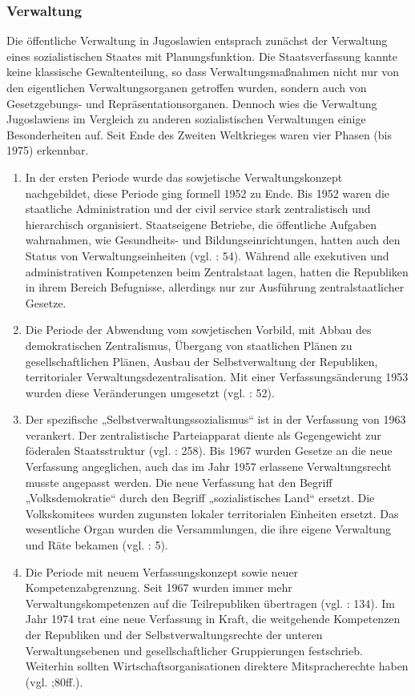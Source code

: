 \subsubsection{Verwaltung}

Die öffentliche Verwaltung in Jugoslawien entsprach zunächst der Verwaltung eines sozialistischen Staates mit Planungsfunktion. Die Staatsverfassung kannte keine klassische Gewaltenteilung, so dass Verwaltungsmaßnahmen nicht nur von den eigentlichen Verwaltungsorganen getroffen wurden, sondern auch von Gesetzgebungs- und Repräsentationsorganen. Dennoch wies die Verwaltung Jugoslawiens im Vergleich zu anderen sozialistischen Verwaltungen einige Besonderheiten auf. Seit Ende des Zweiten Weltkrieges waren vier Phasen (bis 1975) erkennbar.
\begin{enumerate}[label={\Roman*}:,align=left,  leftmargin=*]
\item  In der ersten Periode wurde das sowjetische Verwaltungskonzept nachgebildet, diese Periode ging formell 1952 zu Ende. Bis 1952 waren die staatliche Administration und der civil service stark zentralistisch und hierarchisch organisiert. Staatseigene Betriebe, die öffentliche Aufgaben wahrnahmen, wie Gesundheits- und Bildungseinrichtungen, hatten auch den Status von Verwaltungseinheiten (vgl. \cite{sevic} : 54). Während alle exekutiven und administrativen Kompetenzen beim Zentralstaat lagen, hatten die Republiken in ihrem Bereich Befugnisse, allerdings nur zur Ausführung zentralstaatlicher Gesetze.
\item Die Periode der Abwendung vom sowjetischen Vorbild, mit Abbau des demokratischen Zentralismus, Übergang von staatlichen Plänen zu gesellschaftlichen Plänen, Ausbau der Selbstverwaltung der Republiken, territorialer Verwaltungsdezentralisation. Mit einer Verfassungsänderung 1953 wurden diese Veränderungen umgesetzt (vgl. \cite{beckm90} : 52).
\item Der spezifische „Selbstverwaltungssozialismus“ ist in der Verfassung von 1963 verankert. Der zentralistische Parteiapparat diente als Gegengewicht zur föderalen Staatsstruktur (vgl. \cite{roggemann} : 258). Bis 1967 wurden Gesetze an die neue Verfassung angeglichen, auch das im Jahr 1957 erlassene Verwaltungsrecht musste angepasst werden. Die neue Verfassung hat den Begriff „Volksdemokratie“ durch den Begriff „sozialistisches Land“ ersetzt. Die Volkskomitees wurden zugunsten lokaler territorialen Einheiten ersetzt. Das wesentliche Organ wurden die Versammlungen, die ihre eigene Verwaltung und Räte bekamen (vgl. \cite{blago69} : 5). 
\item Die Periode mit neuem Verfassungskonzept sowie neuer Kompetenzabgrenzung. Seit 1967 wurden immer mehr Verwaltungskompetenzen auf die Teilrepubliken übertragen (vgl. \cite{grot} : 134). Im Jahr 1974 trat eine neue Verfassung in Kraft, die weitgehende Kompetenzen der Republiken und der Selbstverwaltungsrechte der unteren Verwaltungsebenen und gesellschaftlicher Gruppierungen festschrieb. Weiterhin sollten Wirtschaftsorganisationen direktere Mitspracherechte haben (vgl.  \cite{beckm90};80ff.). 
\end{enumerate}

